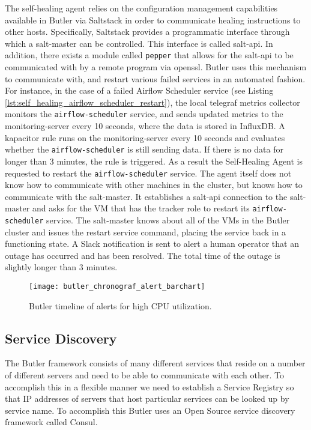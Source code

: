 The self-healing agent relies on the configuration management capabilities available in Butler via Saltstack in order to communicate healing instructions to other hosts. Specifically, Saltstack provides a programmatic interface through which a salt-master can be controlled. This interface is called salt-api. In addition, there exists a module called \texttt{pepper} that allows for the salt-api to be communicated with by a remote program via openssl. Butler uses this mechanism to communicate with, and restart various failed services in an automated fashion. For instance, in the case of a failed Airflow Scheduler service (see Listing \ref{lst:self_healing_airflow_scheduler_restart}), the local telegraf metrics collector monitors the \texttt{airflow-scheduler} service, and sends updated metrics to the monitoring-server every 10 seconds, where the data is stored in InfluxDB. A kapacitor rule runs on the monitoring-server every 10 seconds and evaluates whether the \texttt{airflow-scheduler} is still sending data. If there is no data for longer than 3 minutes, the rule is triggered. As a result the Self-Healing Agent is requested to restart the \texttt{airflow-scheduler} service. The agent itself does not know how to communicate with other machines in the cluster, but knows how to communicate with the salt-master. It establishes a salt-api connection to the salt-master and asks for the VM that has the tracker role to restart its \texttt{airflow-scheduler} service. The salt-master knows about all of the VMs in the Butler cluster and issues the restart service command, placing the service back in a functioning state. A Slack notification is sent to alert a human operator that an outage has occurred and has been resolved. The total time of the outage is slightly longer than 3 minutes.

\begin{figure}[h]
    \texttt{[image: butler\_chronograf\_alert\_barchart]}
    \centering
    \caption {Butler timeline of alerts for high CPU utilization.}
    \label{fig:butler_chronograf_alert_barchart}
\end{figure} 




\subsection{Service Discovery} 
\label{sec:design_consul}

The Butler framework consists of many different services that reside on a number of different servers and need to be able to communicate with each other. To accomplish this in a flexible manner we need to establish a Service Registry so that IP addresses of servers that host particular services can be looked up by service name. To accomplish this Butler uses an Open Source service discovery framework called Consul\autocite{Consul_by_HashiCorp}.

